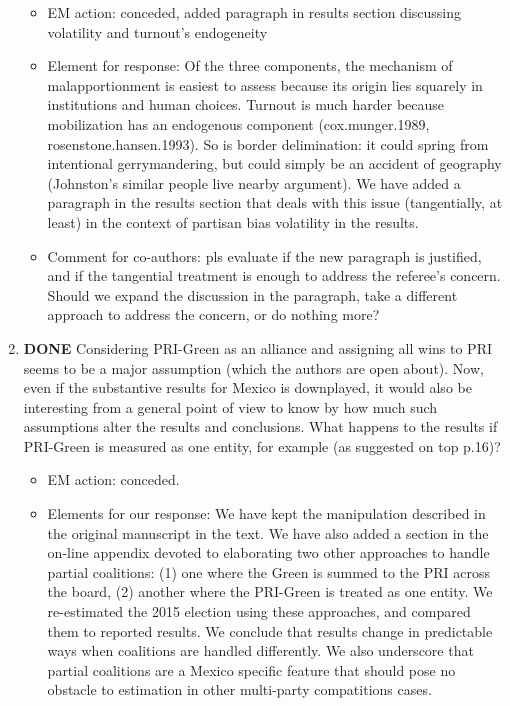\documentclass{article}
\begin{document}
\begin{enumerate}
\label{sec:orgheadline11}
\begin{itemize}
\item EM action: conceded, added paragraph in results section discussing volatility and turnout's endogeneity
\item Element for response: Of the three components, the mechanism of malapportionment is easiest to assess because its origin lies squarely in institutions and human choices. Turnout is much harder because mobilization has an endogenous component (cox.munger.1989, rosenstone.hansen.1993). So is border delimination: it could spring from intentional gerrymandering, but could simply be an accident of geography (Johnston's similar people live nearby argument). We have added a paragraph in the results section that deals with this issue (tangentially, at least) in the context of partisan bias volatility in the results.
\item Comment for co-authors: pls evaluate if the new paragraph is justified, and if the tangential treatment is enough to address the referee's concern. Should we expand the discussion in the paragraph, take a different approach to address the concern, or do nothing more?
\end{itemize}
\item {\bfseries\sffamily DONE} Considering PRI-Green as an alliance and assigning all wins to PRI seems to be a major assumption (which the authors are open about). Now, even if the substantive results for Mexico is downplayed, it would also be interesting from a general point of view to know by how much such assumptions alter the results and conclusions. What happens to the results if PRI-Green is measured as one entity, for example (as suggested on top p.16)?
\label{sec:orgheadline12}
\begin{itemize}
\item EM action: conceded.
\item Elements for our response: We have kept the manipulation described in the original manuscript in the text. We have also added a section in the on-line appendix devoted to elaborating two other approaches to handle partial coalitions: (1) one where the Green is summed to the PRI across the board, (2) another where the PRI-Green is treated as one entity. We re-estimated the 2015 election using these approaches, and compared them to reported results. We conclude that results change in predictable ways when coalitions are handled differently. We also underscore that partial coalitions are a Mexico specific feature that should pose no obstacle to estimation in other multi-party compatitions cases.

\end{itemize}
\end{enumerate}
\end{document}
